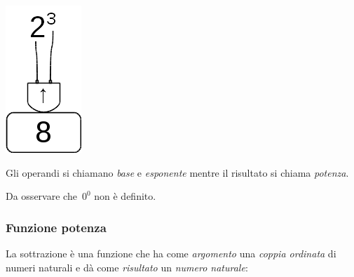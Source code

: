 \begin{inaccessibleblock}[]
\begin{minipage}{0.80\textwidth}
 \centering
   
\end{minipage}%
\begin{minipage}{0.15\textwidth}
 \centering
 \includegraphics[scale=0.35]{img/op_pot.png}
\end{minipage}%
\end{inaccessibleblock}

Gli operandi si chiamano \emph{base} e \emph{esponente} mentre il 
risultato si chiama \emph{potenza}.

Da osservare che~\(0^0\) non è definito.

\subsubsection{Funzione potenza}

La sottrazione è una funzione che ha come \emph{argomento} una \emph{coppia 
ordinata} di numeri naturali e dà come \emph{risultato} un \emph{numero 
naturale}:

\vspace{1em}
\begin{minipage}[t]{.48\textwidth}
\begin{center}
\begin{inaccessibleblock}
\end{inaccessibleblock}
\end{center}
\end{minipage}
\hfill
\begin{minipage}[t]{.48\textwidth}
\begin{center}
\begin{inaccessibleblock}
\end{inaccessibleblock}
\end{center}
\end{minipage}


